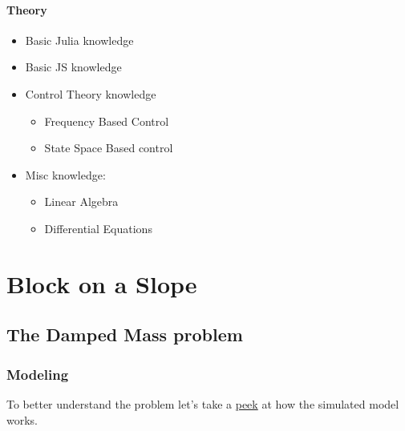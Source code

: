\documentclass[
  8pt,
  a4paper,
]{book}
\begin{document}
\subsection{Theory}\label{theory}

\begin{itemize}
\item
  Basic Julia knowledge
\item
  Basic JS knowledge
\item
  Control Theory knowledge

  \begin{itemize}
  \item
    Frequency Based Control
  \item
    State Space Based control
  \end{itemize}
\item
  Misc knowledge:

  \begin{itemize}
  \item
    Linear Algebra
  \item
    Differential Equations
  \end{itemize}
\end{itemize}

\part{Block on a Slope}

\chapter{The Damped Mass problem}\label{the-damped-mass-problem}

\section{Modeling}\label{modeling}

To better understand the problem let's take a
\href{https://github.com/janismac/ControlChallenges/blob/gh-pages/js/models/BlockOnSlope.js}{peek}
at how the simulated model works.
\end{document}

